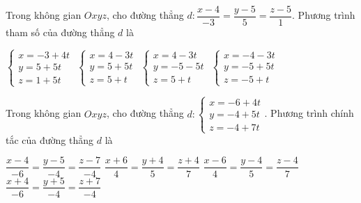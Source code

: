 \documentclass[12pt,a4paper]{article}
\begin{document}
\begin{ex}
 Trong không gian ${Oxyz}$, cho đường thẳng ${d}: \dfrac{x - 4}{-3}=\dfrac{y - 5}{5}=\dfrac{z - 5}{1}$. Phương trình tham số của đường thẳng ${d}$ là
 
\choice
{ $\left\{ \begin{array}{l}x = -3+4t\\ y = 5+5t\\z = 1+5t\end{array} \right.$ }
   { \True $\left\{ \begin{array}{l}x = 4-3t\\ y = 5+5t\\z = 5+t\end{array} \right.$ }
     { $\left\{ \begin{array}{l}x = 4-3t\\ y = -5-5t\\z = 5+t\end{array} \right.$ }
    { $\left\{ \begin{array}{l}x = -4-3t\\ y = -5+5t\\z = -5+t\end{array} \right.$ }
\end{ex}

\begin{ex}
 Trong không gian ${Oxyz}$, cho đường thẳng ${d}:\left\{ \begin{array}{l}x = -6+4t\\ y = -4+5t\\z = -4+7t\end{array} \right.$. Phương trình chính tắc của đường thẳng ${d}$ là
 
\choice
{ $\dfrac{x - 4}{-6}=\dfrac{y - 5}{-4}=\dfrac{z - 7}{-4}$ }
   { \True $\dfrac{x + 6}{4}=\dfrac{y + 4}{5}=\dfrac{z + 4}{7}$ }
     { $\dfrac{x - 6}{4}=\dfrac{y - 4}{5}=\dfrac{z - 4}{7}$ }
    { $\dfrac{x + 4}{-6}=\dfrac{y + 5}{-4}=\dfrac{z + 7}{-4}$ }
\end{ex}
\end{document}

